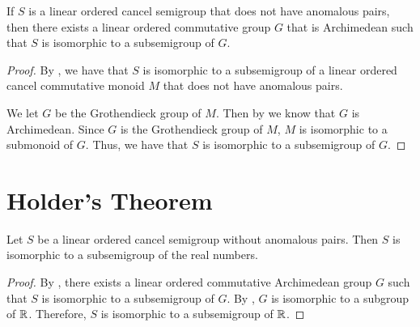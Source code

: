 \begin{theorem}\label{to_arch_group}
    \leanok
    If $S$ is a linear ordered cancel semigroup
    that does not have anomalous pairs, then
    there exists a linear ordered commutative group $G$
    that is Archimedean
    such that $S$ is isomorphic to a subsemigroup of $G$.
\end{theorem}
\begin{proof}\leanok
By , we have that
$S$ is isomorphic to a subsemigroup of a
linear ordered cancel commutative monoid $M$ that
does not have anomalous pairs.

We let $G$ be the Grothendieck group of $M$.
Then by  we know that $G$
is Archimedean. Since $G$ is the Grothendieck group of $M$,
$M$ is isomorphic to a submonoid of $G$. Thus,
we have that $S$ is isomorphic to a subsemigroup of $G$.
\end{proof}

\section{Holder's Theorem}

\begin{theorem}\label{holder_not_anom}
    \leanok
    Let $S$ be a linear ordered cancel semigroup
    without anomalous pairs. Then $S$ is isomorphic
    to a subsemigroup of the real numbers.
\end{theorem}
\begin{proof}\leanok
By , there exists a linear ordered commutative
Archimedean group $G$
such that $S$ is isomorphic to a subsemigroup of $G$.
By , $G$ is isomorphic to a subgroup of $\mathbb{R}$.
Therefore, $S$ is isomorphic to a subsemigroup of $\mathbb{R}$.
\end{proof}